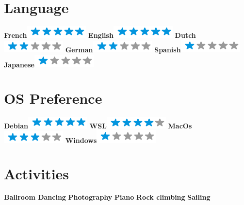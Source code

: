 \begin{aside}
	~
	\makecvsideheader%
	\section{Language}
	\textbf{French}\includegraphics[scale=0.40]{img/5stars.png}
	\textbf{English}\includegraphics[scale=0.40]{img/5stars.png}
	\textbf{Dutch}\includegraphics[scale=0.40]{img/2stars.png}
	\textbf{German}\includegraphics[scale=0.40]{img/2stars.png}
	\textbf{Spanish}\includegraphics[scale=0.40]{img/1stars.png}
	\textbf{Japanese}\includegraphics[scale=0.40]{img/1stars.png}
	~
	\section{OS Preference}
	\textbf{Debian}\includegraphics[scale=0.40]{img/5stars.png}
	\textbf{WSL}\includegraphics[scale=0.40]{img/4stars.png}
	\textbf{MacOs}\includegraphics[scale=0.40]{img/3stars.png}
	\textbf{Windows}\includegraphics[scale=0.40]{img/1stars.png}
	~
	\section{Activities}
	\textbf{Ballroom Dancing}
	\textbf{Photography}
	\textbf{Piano}
	\textbf{Rock climbing}
	\textbf{Sailing}
\end{aside}
